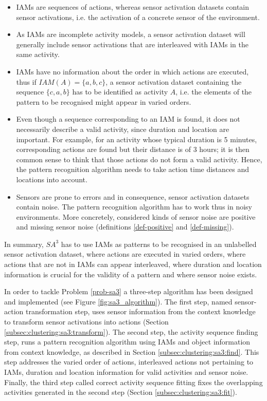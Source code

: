 \begin{itemize}
 \item IAMs are sequences of actions, whereas sensor activation datasets contain sensor activations, i.e. the activation of a concrete sensor of the environment.
 \item As IAMs are incomplete activity models, a sensor activation dataset will generally include sensor activations that are interleaved with IAMs in the same activity.
 \item IAMs have no information about the order in which actions are executed, thus if $IAM(A) = \{a, b, c\}$, a sensor activation dataset containing the sequence $\{c, a, b\}$ has to be identified as activity $A$, i.e. the elements of the pattern to be recognised might appear in varied orders.
 \item Even though a sequence corresponding to an IAM is found, it does not necessarily describe a valid activity, since duration and location are important. For example, for an activity whose typical duration is 5 minutes, corresponding actions are found but their distance is of 3 hours; it is then common sense to think that those actions do not form a valid activity. Hence, the pattern recognition algorithm needs to take action time distances and locations into account.
 \item Sensors are prone to errors and in consequence, sensor activation datasets contain noise. The pattern recognition algorithm has to work thus in noisy environments. More concretely, considered kinds of sensor noise are positive and missing sensor noise (definitions \ref{def-positive} and \ref{def-missing}).
\end{itemize}

In summary, $SA^3$ has to use IAMs as patterns to be recognised in an unlabelled sensor activation dataset, where actions are executed in varied orders, where actions that are not in IAMs can appear interleaved, where duration and location information is crucial for the validity of a pattern and where sensor noise exists. 

In order to tackle Problem \ref{prob-sa3} a three-step algorithm has been designed and implemented (see Figure \ref{fig:sa3_algorithm}). The first step, named sensor-action transformation step, uses sensor information from the context knowledge to transform sensor activations into actions (Section \ref{subsec:clustering:sa3:transform}). The second step, the activity sequence finding step, runs a pattern recognition algorithm using IAMs and object information from context knowledge, as described in Section \ref{subsec:clustering:sa3:find}. This step addresses the varied order of actions, interleaved actions not pertaining to IAMs, duration and location information for valid activities and sensor noise. Finally, the third step called correct activity sequence fitting fixes the overlapping activities generated in the second step (Section \ref{subsec:clustering:sa3:fit}).

